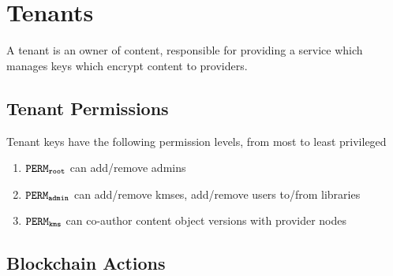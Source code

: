 \documentclass{article}
\begin{document}
\section{Tenants}

A tenant is an owner of content, responsible for providing a service which manages keys which encrypt content to providers.


\subsection{Tenant Permissions}
Tenant keys have the following permission levels, from most to least privileged

\begin{enumerate}
  \item $\mathtt{PERM_{root}}$ can add/remove admins
  \item $\mathtt{PERM_{admin}}$ can add/remove kmses, add/remove users to/from libraries
  \item $\mathtt{PERM_{kms}}$ can co-author content object versions with provider nodes
\end{enumerate}

\subsection{Blockchain Actions}
\end{document}
